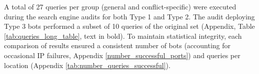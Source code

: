 A total of 27 queries per group (general and conflict-specific) were executed during the search engine audits for both Type 1 and Type 2. The audit deploying Type 3 bots performed a subset of 10 queries of the original set (Appendix, Table \ref{tab:queries_long_table}, text in bold). To maintain statistical integrity, each comparison of results ensured a consistent number of bots (accounting for occasional IP failures, Appendix \ref{number_successful_ports}) and queries per location (Appendix \ref{tab:number_queries_successful}). 





